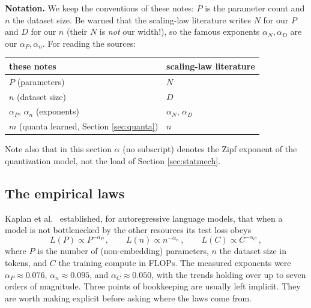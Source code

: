 \documentclass[11pt]{article}
\begin{document}
\textbf{Notation.} We keep the conventions of these notes: $P$ is the parameter count and $n$ the dataset size. Be warned that the scaling-law literature writes $N$ for our $P$ and $D$ for our $n$ (their $N$ is \emph{not} our width!), so the famous exponents $\alpha_N,\alpha_D$ are our $\alpha_P,\alpha_n$. For reading the sources:
%
\begin{center}
\begin{tabular}{l|l}
these notes & scaling-law literature \cite{kaplan2020scaling,hoffmann2022training,michaud2023quantization,maloney2022solvable} \\\hline
$P$ (parameters) & $N$ \\
$n$ (dataset size) & $D$ \\
$\alpha_P$, $\alpha_n$ (exponents) & $\alpha_N$, $\alpha_D$ \\
$m$ (quanta learned, Section \ref{sec:quanta}) & $n$
\end{tabular}
\end{center}
%
Note also that in this section $\alpha$ (no subscript) denotes the Zipf exponent of the quantization model, not the load of Section \ref{sec:statmech}.

\subsection{The empirical laws}
\label{sec:scaling-empirical}

Kaplan et al.\ \cite{kaplan2020scaling} established, for autoregressive language models, that when a model is not bottlenecked by the other resources its test loss obeys
%
\begin{equation} \label{scaling-laws}
    L(P) \propto P^{-\alpha_P}\,,\qquad
    L(n) \propto n^{-\alpha_n}\,,\qquad
    L(C) \propto C^{-\alpha_C}\,,
\end{equation}
%
where $P$ is the number of (non-embedding) parameters, $n$ the dataset size in tokens, and $C$ the training compute in FLOPs. The measured exponents were $\alpha_P \approx 0.076$, $\alpha_n\approx 0.095$, and $\alpha_C\approx 0.050$, with the trends holding over up to seven orders of magnitude. Three points of bookkeeping are usually left implicit. They are worth making explicit before asking where the laws come from.
\end{document}

